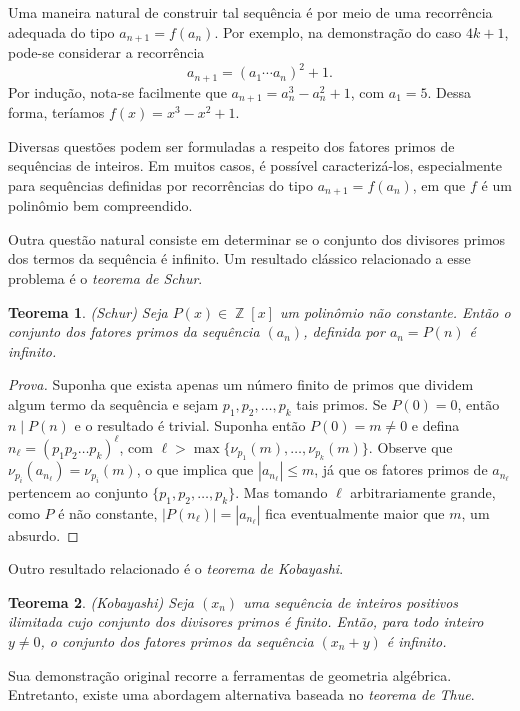\documentclass{hipatia}
\DeclareMathOperator{\Z}{\mathbb{Z}}
\newtheorem{theorem*}{Teorema}
\begin{document}
Uma maneira natural de construir tal sequência é por meio de uma recorrência adequada do tipo $a_{n+1}=f(a_n)$. Por exemplo, na demonstração do caso $4k+1$, pode-se considerar a recorrência \[a_{n+1}=(a_1\cdots a_n)^2+1.\] Por indução, nota-se facilmente que $a_{n+1}=a_n^3-a_n^2+1$, com $a_1=5$. Dessa forma, teríamos $f(x)=x^3-x^2+1$.

Diversas questões podem ser formuladas a respeito dos fatores primos de sequências de inteiros. Em muitos casos, é possível caracterizá-los, especialmente para sequências definidas por recorrências do tipo $a_{n+1}=f(a_n)$, em que $f$ é um polinômio bem compreendido.

Outra questão natural consiste em determinar se o conjunto dos divisores primos dos termos da sequência é infinito. Um resultado clássico relacionado a esse problema é o \textit{teorema de Schur}.

\begin{theorem*}
(Schur) Seja $P(x) \in \Z[x]$ um polinômio não constante. Então o conjunto dos fatores primos da sequência $(a_n)$, definida por $a_n=P(n)$ é infinito.
\end{theorem*}

\begin{proof}[Prova]
Suponha que exista apenas um número finito de primos que dividem algum termo da sequência e sejam $p_1, p_2, \ldots, p_k$ tais primos. Se $P(0)=0$, então $n\mid P(n)$ e o resultado é trivial. Suponha então $P(0) = m \ne 0$ e defina $n_\ell = (p_1p_2\ldots p_k)^{\ell}$, com $\ell > \max\{\nu_{p_1}(m), \ldots, \nu_{p_k}(m)\}$. Observe que $\nu_{p_i}(a_{n_\ell})=\nu_{p_i}(m)$, o que implica que $|a_{n_\ell}| \le m$, já que os fatores primos de $a_{n_\ell}$ pertencem ao conjunto $\{p_1, p_2, \ldots, p_k\}$. Mas tomando $\ell$ arbitrariamente grande, como $P$ é não constante, $|P(n_\ell)|=|a_{n_{\ell}}|$ fica eventualmente maior que $m$, um absurdo.
\end{proof}

Outro resultado relacionado é o \textit{teorema de Kobayashi}.

\begin{theorem*}
(Kobayashi) Seja $(x_n)$ uma sequência de inteiros positivos ilimitada cujo conjunto dos divisores primos é finito. Então, para todo inteiro $y \ne 0$, o conjunto dos fatores primos da sequência $(x_n+y)$ é infinito.
\end{theorem*}

Sua demonstração original recorre a ferramentas de geometria algébrica. Entretanto, existe uma abordagem alternativa baseada no \textit{teorema de Thue}.
\end{document}
